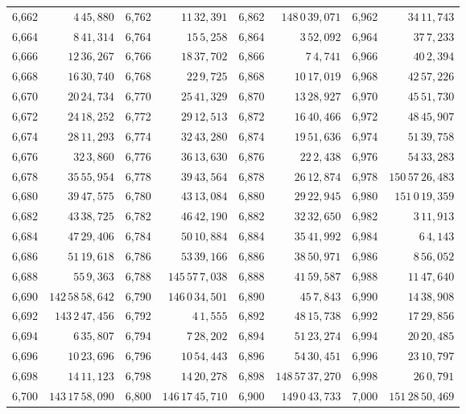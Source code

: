 \begin{tabular}{|r|r||r|r||r|r||r|r|}
6,662 & \(4\,45,\!880\) & 6,762 & \(11\,32,\!391\) & 6,862 & \(148\,0\,39,\!071\) & 6,962 & \(34\,11,\!743\) \\
6,664 & \(8\,41,\!314\) & 6,764 & \(15\,5,\!258\) & 6,864 & \(3\,52,\!092\) & 6,964 & \(37\,7,\!233\) \\
6,666 & \(12\,36,\!267\) & 6,766 & \(18\,37,\!702\) & 6,866 & \(7\,4,\!741\) & 6,966 & \(40\,2,\!394\) \\
6,668 & \(16\,30,\!740\) & 6,768 & \(22\,9,\!725\) & 6,868 & \(10\,17,\!019\) & 6,968 & \(42\,57,\!226\) \\
6,670 & \(20\,24,\!734\) & 6,770 & \(25\,41,\!329\) & 6,870 & \(13\,28,\!927\) & 6,970 & \(45\,51,\!730\) \\[1pt]
6,672 & \(24\,18,\!252\) & 6,772 & \(29\,12,\!513\) & 6,872 & \(16\,40,\!466\) & 6,972 & \(48\,45,\!907\) \\
6,674 & \(28\,11,\!293\) & 6,774 & \(32\,43,\!280\) & 6,874 & \(19\,51,\!636\) & 6,974 & \(51\,39,\!758\) \\
6,676 & \(32\,3,\!860\) & 6,776 & \(36\,13,\!630\) & 6,876 & \(22\,2,\!438\) & 6,976 & \(54\,33,\!283\) \\
6,678 & \(35\,55,\!954\) & 6,778 & \(39\,43,\!564\) & 6,878 & \(26\,12,\!874\) & 6,978 & \(150\,57\,26,\!483\) \\
6,680 & \(39\,47,\!575\) & 6,780 & \(43\,13,\!084\) & 6,880 & \(29\,22,\!945\) & 6,980 & \(151\,0\,19,\!359\) \\[1pt]
6,682 & \(43\,38,\!725\) & 6,782 & \(46\,42,\!190\) & 6,882 & \(32\,32,\!650\) & 6,982 & \(3\,11,\!913\) \\
6,684 & \(47\,29,\!406\) & 6,784 & \(50\,10,\!884\) & 6,884 & \(35\,41,\!992\) & 6,984 & \(6\,4,\!143\) \\
6,686 & \(51\,19,\!618\) & 6,786 & \(53\,39,\!166\) & 6,886 & \(38\,50,\!971\) & 6,986 & \(8\,56,\!052\) \\
6,688 & \(55\,9,\!363\) & 6,788 & \(145\,57\,7,\!038\) & 6,888 & \(41\,59,\!587\) & 6,988 & \(11\,47,\!640\) \\
6,690 & \(142\,58\,58,\!642\) & 6,790 & \(146\,0\,34,\!501\) & 6,890 & \(45\,7,\!843\) & 6,990 & \(14\,38,\!908\) \\[1pt]
6,692 & \(143\,2\,47,\!456\) & 6,792 & \(4\,1,\!555\) & 6,892 & \(48\,15,\!738\) & 6,992 & \(17\,29,\!856\) \\
6,694 & \(6\,35,\!807\) & 6,794 & \(7\,28,\!202\) & 6,894 & \(51\,23,\!274\) & 6,994 & \(20\,20,\!485\) \\
6,696 & \(10\,23,\!696\) & 6,796 & \(10\,54,\!443\) & 6,896 & \(54\,30,\!451\) & 6,996 & \(23\,10,\!797\) \\
6,698 & \(14\,11,\!123\) & 6,798 & \(14\,20,\!278\) & 6,898 & \(148\,57\,37,\!270\) & 6,998 & \(26\,0,\!791\) \\
6,700 & \(143\,17\,58,\!090\) & 6,800 & \(146\,17\,45,\!710\) & 6,900 & \(149\,0\,43,\!733\) & 7,000 & \(151\,28\,50,\!469\) \\
\hline
\end{tabular}\par
\endgroup
\clearpage
